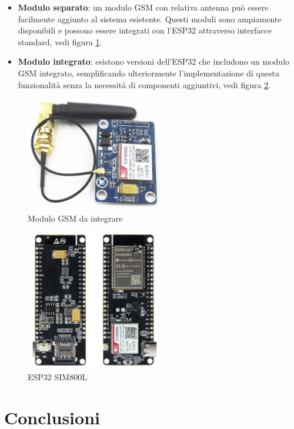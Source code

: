 \documentclass[12pt, a4paper, italian]{report}
\numberwithin{figure}{chapter}
\numberwithin{table}{chapter}
\begin{document}
\begin{itemize}
    \item \textbf{Modulo separato}: un modulo GSM con relativa antenna può essere facilmente aggiunto al sistema esistente. Questi moduli sono ampiamente disponibili e possono essere integrati con l'ESP32 attraverso interfacce standard, vedi figura  \ref{fig:modulo_gsm}.
    \item \textbf{Modulo integrato}: esistono versioni dell'ESP32 che includono un modulo GSM integrato, semplificando ulteriormente l'implementazione di questa funzionalità senza la necessità di componenti aggiuntivi, vedi figura \ref{fig:esp32_gsm}.
\end{itemize}

\begin{figure}[h]
  \centering
  \includegraphics[width=6cm]{gsm_module.png}
  \caption{Modulo GSM da integrare}
  \label{fig:modulo_gsm}
\end{figure}

\begin{figure}[h]
  \centering
  \includegraphics[width=6cm]{esp32_gsm.png}
  \caption{ESP32 SIM800L}
  \label{fig:esp32_gsm}
\end{figure}

\chapter{Conclusioni}
\end{document}
